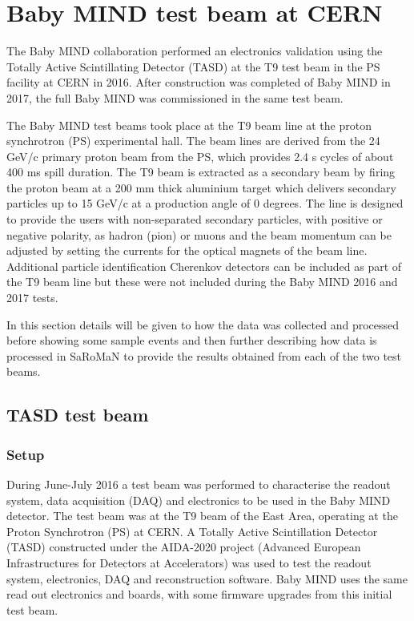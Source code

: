 \chapter{Baby MIND test beam at CERN}
\label{c:Testbeam}

The Baby MIND collaboration performed an electronics validation using the Totally Active Scintillating Detector (TASD) at the T9 test beam in the PS facility at CERN in 2016. After construction was completed of Baby MIND in 2017, the full Baby MIND was commissioned in the same test beam.

The Baby MIND test beams took place at the T9 beam line at the proton synchrotron (PS) experimental hall. The beam lines are derived from the 24 GeV/c primary proton beam from the PS, which provides 2.4 s cycles of about 400 ms spill duration. The T9 beam is extracted as a secondary beam by firing the proton beam at a 200 mm thick aluminium target which delivers secondary particles up to 15 GeV/c at a production angle of 0 degrees. The line is designed to provide the users with non-separated secondary particles, with positive or negative polarity, as hadron (pion) or muons and the beam momentum can be adjusted by setting the currents for the optical magnets of the beam line. Additional particle identification Cherenkov detectors can be included as part of the T9 beam line but these were not included during the Baby MIND 2016 and 2017 tests.

In this section details will be given to how the data was collected and processed before showing some sample events and then further describing how data is processed in SaRoMaN to provide the results obtained from each of the two test beams.


\section{TASD test beam}

\subsection{Setup}
During June-July 2016 a test beam was performed to characterise the readout system, data acquisition (DAQ) and electronics to be used in the Baby MIND detector. The test beam was at the T9 beam of the East Area, operating at the Proton Synchrotron (PS) at CERN. A Totally Active Scintillation Detector (TASD) constructed under the AIDA-2020 project (Advanced European Infrastructures for Detectors at Accelerators) was used to test the readout system, electronics, DAQ and reconstruction software. Baby MIND uses the same read out electronics and boards, with some firmware upgrades from this initial test beam.

